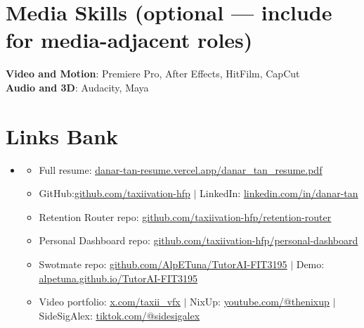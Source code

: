 \documentclass[letterpaper,11pt]{article}
\newcommand{\resumeItem}[1]{\item\small{{#1 \vspace{-2pt}}}}
\newcommand{\resumeSubHeadingListStart}{\begin{itemize}[leftmargin=0.15in, label={}]}
\newcommand{\resumeSubHeadingListEnd}{\end{itemize}}
\newcommand{\resumeItemListStart}{\begin{itemize}}
\newcommand{\resumeItemListEnd}{\end{itemize}\vspace{-5pt}}
\begin{document}
\section{Media Skills (optional --- include for media-adjacent roles)}
 \begin{itemize}[leftmargin=0.15in, label={}]
    \small{\item{
     \textbf{Video and Motion}{: Premiere Pro, After Effects, HitFilm, CapCut} \\
     \textbf{Audio and 3D}{: Audacity, Maya}
    }}
 \end{itemize}

\section{Links Bank}
  \resumeSubHeadingListStart
    \item[]
    \resumeItemListStart
      \resumeItem{Full resume: \href{https://danar-tan-resume.vercel.app/danar_tan_resume.pdf}{\underline{danar-tan-resume.vercel.app/danar\_tan\_resume.pdf}}}
      \resumeItem{GitHub:\href{https://github.com/taxiivation-hfp}{\underline{github.com/taxiivation-hfp}} $|$ LinkedIn: \href{https://linkedin.com/in/danar-tan}{\underline{linkedin.com/in/danar-tan}}}
      \resumeItem{Retention Router repo: \href{https://github.com/taxiivation-hfp/retention-router}{\underline{github.com/taxiivation-hfp/retention-router}}}
      \resumeItem{Personal Dashboard repo: \href{https://github.com/taxiivation-hfp/personal-dashboard}{\underline{github.com/taxiivation-hfp/personal-dashboard}}}
      \resumeItem{Swotmate repo: \href{https://github.com/AlpETuna/TutorAI-FIT3195}{\underline{github.com/AlpETuna/TutorAI-FIT3195}} $|$ Demo: \href{https://alpetuna.github.io/TutorAI-FIT3195/}{\underline{alpetuna.github.io/TutorAI-FIT3195}}}
      \resumeItem{Video portfolio: \href{http://x.com/taxii_vfx/all}{\underline{x.com/taxii\_vfx}} $|$ NixUp: \href{https://www.youtube.com/@thenixup}{\underline{youtube.com/@thenixup}} $|$ SideSigAlex: \href{https://www.tiktok.com/@sidesigalex}{\underline{tiktok.com/@sidesigalex}}}
    \resumeItemListEnd
  \resumeSubHeadingListEnd
\end{document}
